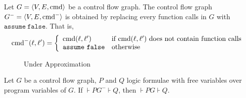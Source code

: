 
Let $G = \langle V, E, \textmd{cmd} \rangle$ be a control flow
graph. The control flow graph $G^- = \langle V, E,
\textmd{cmd}^- \rangle$ is obtained by replacing every
function calls in $G$ with $\mathtt{assume\ false}$. That is,
\begin{equation*}
  \textmd{cmd}^- (\ell, \ell') =
  \left\{
    \begin{array}{ll}
      \textmd{cmd} (\ell, \ell') & 
      \textmd{if } \textmd{cmd} (\ell, \ell') 
      \textmd{ does not contain function calls}\\
      \mathtt{assume\ false} &
      \textmd{otherwise}
    \end{array}
  \right.
\end{equation*}

\begin{figure}
  \centering

  \caption{Under Approximation}
  \label{figure:under-approximation}
\end{figure}

\begin{proposition}
  Let $G$ be a control flow graph, $P$ and $Q$ logic formulae with
  free variables over program variables of $G$. If $\assert{P}
  G^- \assert{Q}$, then 
  $\assert{P} G \assert{Q}$.
\end{proposition}